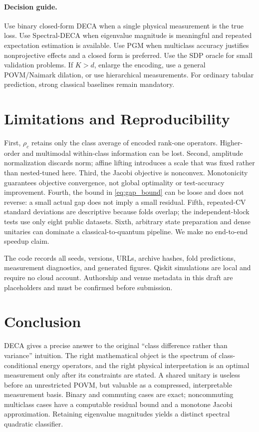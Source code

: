 \documentclass[10pt,twocolumn]{article}
\theoremstyle{definition}
\theoremstyle{remark}
\begin{document}
\paragraph{Decision guide.}
Use binary closed-form DECA when a single physical measurement is the true
loss.  Use Spectral-DECA when eigenvalue magnitude is meaningful and repeated
expectation estimation is available.  Use PGM when multiclass accuracy
justifies nonprojective effects and a closed form is preferred.  Use the SDP
oracle for small validation problems.  If $K>d$, enlarge the encoding, use a
general POVM/Naimark dilation, or use hierarchical measurements.  For ordinary
tabular prediction, strong classical baselines remain mandatory.

\section{Limitations and Reproducibility}
\label{sec:limitations}

First, $\rho_c$ retains only the class average of encoded rank-one operators.
Higher-order and multimodal within-class information can be lost.  Second,
amplitude normalization discards norm; affine lifting introduces a scale that
was fixed rather than nested-tuned here.  Third, the Jacobi objective is
nonconvex.  Monotonicity guarantees objective convergence, not global
optimality or test-accuracy improvement.  Fourth, the bound in
\cref{eq:gap_bound} can be loose and does not reverse: a small actual gap does
not imply a small residual.  Fifth, repeated-CV standard deviations are
descriptive because folds overlap; the independent-block tests use only eight
public datasets.  Sixth, arbitrary state preparation and dense unitaries can
dominate a classical-to-quantum pipeline.  We make no end-to-end speedup claim.

The code records all seeds, versions, URLs, archive hashes, fold predictions,
measurement diagnostics, and generated figures.  Qiskit simulations are local
and require no cloud account.  Authorship and venue metadata in this draft are
placeholders and must be confirmed before submission.

\section{Conclusion}
\label{sec:conclusion}

DECA gives a precise answer to the original ``class difference rather than
variance'' intuition.  The right mathematical object is the spectrum of
class-conditional energy operators, and the right physical interpretation is
an optimal measurement only after its constraints are stated.  A shared
unitary is useless before an unrestricted POVM, but valuable as a compressed,
interpretable measurement basis.  Binary and commuting cases are exact;
noncommuting multiclass cases have a computable residual bound and a monotone
Jacobi approximation.  Retaining eigenvalue magnitudes yields a distinct
spectral quadratic classifier.
\end{document}
